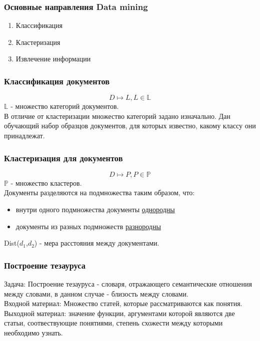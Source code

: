 \documentclass{beamer}
\begin{document}
\begin{frame}
\frametitle{Основные направления Data mining}
\begin{enumerate}
\item{Классификация}
\item{Кластеризация}
\item{Извлечение информации}

\end{enumerate}
\end{frame}

\begin{frame}
\frametitle{Классификация документов}
$$D \mapsto L, L \in \mathbb{L}$$
\vspace{1cm}
$\mathbb{L}$ - множество категорий документов.\\
\vspace{1cm}
В отличие от кластеризации множество категорий задано изначально.
\vspace{1cm}
Дан обучающий набор образцов документов, для которых известно, какому классу они принадлежат.
\end{frame}

\begin{frame}
\frametitle{Кластеризация для документов}
$$D \mapsto P, P \in \mathbb{P}$$
\vspace{1cm}
$\mathbb{P}$ - множество кластеров.\\
\vspace{1cm}
Документы разделяются на подмножества таким образом, что:

\begin{itemize}
\item{внутри одного подмножества документы \underline{однородны}}
\item{документы из разных подмножеств \underline{разнородны} }
\end{itemize}
\vspace{1cm}
Dist($d_{1}$,$d_{2}$) - мера расстояния между документами.
\end{frame}

\begin {frame}
\frametitle{Построение тезауруса}
Задача: Построение тезауруса - словаря, отражающего семантические отношения
между словами, в данном случае - близость между словами.\\
\vspace{1cm}
Входной материал: Множество статей, которые рассматриваются как понятия.\\
\vspace{1cm}
Выходной материал: значение функции, аргументами которой являются
две статьи, соотвествующие понятиями, степень схожести между которыми
необходимо узнать.
\end{frame}
\end{document}
